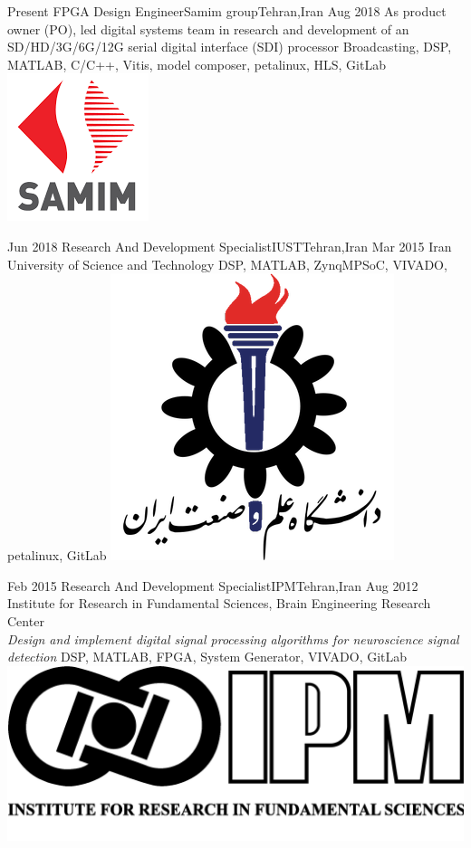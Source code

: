 
\begin{experiences}

  \experience
  {Present} {FPGA Design Engineer}{Samim group}{Tehran,Iran}
  {Aug 2018} {
    As product owner (PO), led digital systems team in research and development of an 
    SD/HD/3G/6G/12G serial digital interface (SDI) processor
  }
  {Broadcasting, DSP, MATLAB, C/C++, Vitis, model composer, petalinux, HLS, GitLab}
  {\includegraphics[scale=0.2]{graphics/samim_logo}}

  \emptySeparator

  \experience
  {Jun 2018} {Research And Development Specialist}{IUST}{Tehran,Iran}
  {Mar 2015} {
    Iran University of Science and Technology
  }
  {DSP, MATLAB, ZynqMPSoC, VIVADO, petalinux, GitLab}
  {\includegraphics[scale=0.12]{graphics/IUST_logo_color}}

  \emptySeparator

  \experience
  {Feb 2015} {Research And Development Specialist}{IPM}{Tehran,Iran}
  {Aug 2012} {
    Institute for Research in Fundamental Sciences, Brain Engineering Research Center\\
    \emph{Design and implement digital signal processing algorithms for neuroscience signal detection}
  }
  {DSP, MATLAB, FPGA, System Generator, VIVADO, GitLab}
  {\includegraphics[scale=0.025]{graphics/IPM_logo}}


\end{experiences}
